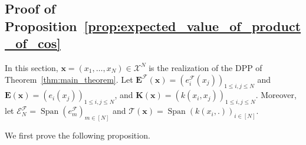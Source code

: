 \documentclass[twoside,11pt]{book}
\newtheorem{lemma}{Lemma}
\numberwithin{theorem}{chapter}
\numberwithin{definition}{chapter}
\numberwithin{proposition}{chapter}
\numberwithin{corollary}{chapter}
\numberwithin{example}{chapter}
\numberwithin{lemma}{chapter}
\numberwithin{assumption}{chapter}
\numberwithin{equation}{chapter}
\numberwithin{figure}{chapter}
\DeclareMathOperator{\Det}{Det}
\DeclareMathOperator{\Span}{\mathrm{Span}}
\DeclareMathOperator{\DPP}{\mathrm{DPP}}
\DeclareMathOperator{\EX}{\mathbb{E}}
\newcommand{\pc}[1]{\textcolor{blue}{#1}}
\begin{document}

\subsection{Proof of Proposition~\ref{prop:expected_value_of_product_of_cos}}
\label{s:proofOfExpectedProduct}
%

In this section, $\bm{x}  = (x_{1}, \dots , x_{N}) \in \mathcal{X}^{N}$ is the realization of the DPP of Theorem~\ref{thm:main_theorem}. Let $\bm{E}^{\mathcal{F}}(\bm{x}) = (e_{i}^{\mathcal{F}}(x_{j}))_{1 \leq i,j \leq N}$ and $\bm{E}(\bm{x}) = (e_{i}(x_{j}))_{1 \leq i,j \leq N}$, and $\bm{K}(\bm{x})= (k(x_{i},x_{j}))_{1 \leq i,j \leq N} $.
Moreover, let $\mathcal{E}^{\mathcal{F}}_{N} = \Span(e_{m}^{\mathcal{F}})_{m \in [N]}$ and $\mathcal{T}(\bm{x}) =  \Span \left( k(x_{i},.) \right)_{i \in [N]}$.

We first prove the following proposition.




\end{document}
